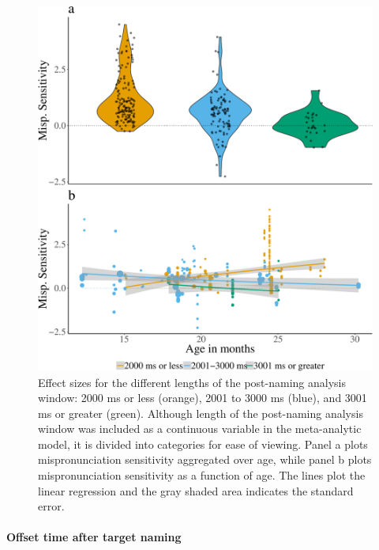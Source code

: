 \documentclass[man]{apa6}
\let\oldparagraph\paragraph
\renewcommand{\paragraph}[1]{\oldparagraph{#1}\mbox{}}
\theoremstyle{definition}
\theoremstyle{definition}
\theoremstyle{definition}
\theoremstyle{remark}
\begin{document}
\begin{figure}
\centering
\includegraphics{VonHolzenBergmann_MPMetaAnalysis_files/figure-latex/Plot-post-name-cond-age-1.pdf}
\caption{\label{fig:Plot-post-name-cond-age}Effect sizes for the different
lengths of the post-naming analysis window: 2000 ms or less (orange),
2001 to 3000 ms (blue), and 3001 ms or greater (green). Although length
of the post-naming analysis window was included as a continuous variable
in the meta-analytic model, it is divided into categories for ease of
viewing. Panel a plots mispronunciation sensitivity aggregated over age,
while panel b plots mispronunciation sensitivity as a function of age.
The lines plot the linear regression and the gray shaded area indicates
the standard error.}
\end{figure}

\paragraph{Offset time after target
naming}\label{offset-time-after-target-naming}
\end{document}
